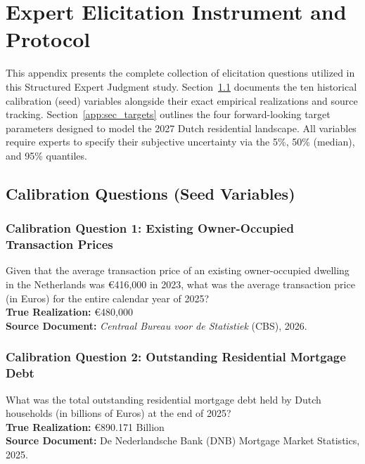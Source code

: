 \chapter{Expert Elicitation Instrument and Protocol}
\label{appendix:elicitation_protocol}

This appendix presents the complete collection of elicitation questions utilized in this Structured Expert Judgment study. Section~\ref{app:sec_calibration} documents the ten historical calibration (seed) variables alongside their exact empirical realizations and source tracking. Section~\ref{app:sec_targets} outlines the four forward-looking target parameters designed to model the 2027 Dutch residential landscape. All variables require experts to specify their subjective uncertainty via the 5\%, 50\% (median), and 95\% quantiles.

\section{Calibration Questions (Seed Variables)}
\label{app:sec_calibration}

\subsection*{Calibration Question 1: Existing Owner-Occupied Transaction Prices}
Given that the average transaction price of an existing owner-occupied dwelling in the Netherlands was €416,000 in 2023, what was the average transaction price (in Euros) for the entire calendar year of 2025?\\\newline
\textbf{True Realization:} €480,000\\\newline
\textbf{Source Document:} \textit{Centraal Bureau voor de Statistiek} (CBS), 2026.

\subsection*{Calibration Question 2: Outstanding Residential Mortgage Debt}
What was the total outstanding residential mortgage debt held by Dutch households (in billions of Euros) at the end of 2025?\\\newline
\textbf{True Realization:} €890.171 Billion\\\newline
\textbf{Source Document:} De Nederlandsche Bank (DNB) Mortgage Market Statistics, 2025.


